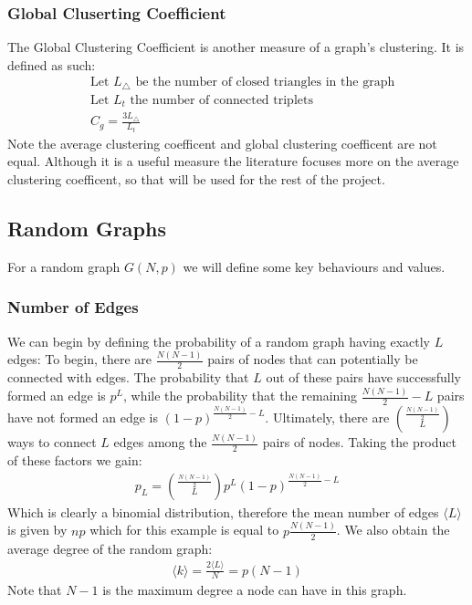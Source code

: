 \documentclass{article}
\begin{document}
        \subsubsection{Global Cluserting Coefficient}
        The Global Clustering Coefficient is another measure of a graph's clustering. It is defined as such:
        \begin{align*}
            &\text{Let $L_\triangle$ be the number of closed triangles in the graph}\\
            &\text{Let $L_t$ the number of connected triplets}\\
            &C_g = \frac{3L_\triangle}{L_t}
        \end{align*}
        Note the average clustering coefficent and global clustering coefficent are not equal. Although it is a useful measure the literature focuses more on the average clustering coefficent, so that will be used for the rest of the project.

        \subsection{Random Graphs}
        For a random graph $G(N,p)$ we will define some key behaviours and values.
            \subsubsection{Number of Edges}
            We can begin by defining the probability of a random graph having exactly $L$ edges:
            To begin, there are $\frac{N(N-1)}{2}$ pairs of nodes that can potentially be connected with edges. The probability that $L$ out of these pairs have successfully formed an edge is $p^L$, while the probability that the remaining $\frac{N(N-1)}{2} - L$ pairs have not formed an edge is $(1-p)^{\frac{N(N-1)}{2} - L}$. Ultimately, there are $\binom{\frac{N(N-1)}{2}}{L}$ ways to connect $L$ edges among the $\frac{N(N-1)}{2}$ pairs of nodes. Taking the product of these factors we gain:
            \begin{align*}
                p_{L} = \binom{\frac{N(N-1)}{2}}{L}p^L(1-p)^{\frac{N(N-1)}{2} -L}
            \end{align*}
            Which is clearly a binomial distribution, therefore the mean number of edges $\langle L \rangle$ is given by $np$ which for this example is equal to $p\frac{N(N-1)}{2}$. We also obtain the average degree of the random graph:
            \begin{align*}
                \langle k \rangle = \frac{2 \langle L \rangle}{N} = p(N-1)
            \end{align*}
            Note that $N-1$ is the maximum degree a node can have in this graph.
\end{document}
